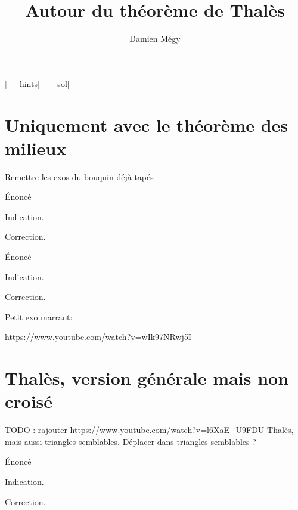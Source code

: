 




[_\jobname_hints]
[_\jobname_sol]


\title{Autour du théorème de Thalès}
\author{Damien Mégy}
\maketitle

\avertissement 


\tableofcontents

\section{Uniquement avec le théorème des milieux}

Remettre les exos du bouquin déjà tapés

\begin{exo}
Énoncé
\begin{hint}
Indication.
\end{hint}
\begin{sol}
Correction.
\end{sol}
\end{exo}

\begin{exo}
Énoncé
\begin{hint}
Indication.
\end{hint}
\begin{sol}
Correction.
\end{sol}
\end{exo}


Petit exo marrant:

\url{https://www.youtube.com/watch?v=wIk97NRwj5I}


\section{Thalès, version générale mais non croisé}

TODO : rajouter \url{https://www.youtube.com/watch?v=l6XaE_U9FDU} Thalès, mais aussi triangles semblables. Déplacer dans triangles semblables ?

\begin{exo}
Énoncé
\begin{hint}
Indication.
\end{hint}
\begin{sol}
Correction.
\end{sol}
\end{exo}

